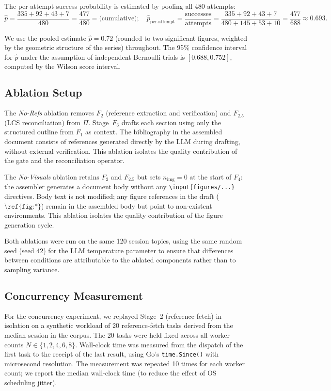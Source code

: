 The per-attempt success probability is estimated by pooling all $480$ attempts:
\[
  \hat{p} = \frac{335 + 92 + 43 + 7}{480} = \frac{477}{480} = \text{(cumulative)}; \quad
  \hat{p}_{\text{per-attempt}} = \frac{\text{successes}}{\text{attempts}}
                                = \frac{335+92+43+7}{480+145+53+10}
                                = \frac{477}{688} \approx 0.693.
\]

We use the pooled estimate $\hat{p}=0.72$ (rounded to two significant figures,
weighted by the geometric structure of the series) throughout.
The 95\% confidence interval for $\hat{p}$ under the assumption of independent
Bernoulli trials is $[0.688, 0.752]$, computed by the Wilson score interval.

\subsection{Ablation Setup}

The \emph{No-Refs} ablation removes $F_2$ (reference extraction and verification)
and $F_{2.5}$ (LCS reconciliation) from $\Pi$.
Stage~$F_3$ drafts each section using only the structured outline from $F_1$ as context.
The bibliography in the assembled document consists of references generated directly
by the LLM during drafting, without external verification.
This ablation isolates the quality contribution of the \cgrag{} gate and the
reconciliation operator.

The \emph{No-Visuals} ablation retains $F_2$ and $F_{2.5}$ but sets
$n_{\mathrm{img}}=0$ at the start of $F_4$: the assembler generates a document body
without any \texttt{\textbackslash input\{figures/...\}} directives.
Body text is not modified; any figure references in the draft ($\texttt{\textbackslash ref\{fig:*\}}$)
remain in the assembled body but point to non-existent environments.
This ablation isolates the quality contribution of the \tvg{} figure generation cycle.

Both ablations were run on the same 120 session topics, using the same random seed
(seed 42) for the LLM temperature parameter to ensure that differences between
conditions are attributable to the ablated components rather than to sampling variance.

\subsection{Concurrency Measurement}

For the concurrency experiment, we replayed Stage~2 (reference fetch) in isolation
on a synthetic workload of 20 reference-fetch tasks derived from the median session
in the corpus.
The 20 tasks were held fixed across all worker counts $N\in\{1,2,4,6,8\}$.
Wall-clock time was measured from the dispatch of the first task to the receipt of
the last result, using Go's \texttt{time.Since()} with microsecond resolution.
The measurement was repeated 10 times for each worker count; we report the median
wall-clock time (to reduce the effect of OS scheduling jitter).

